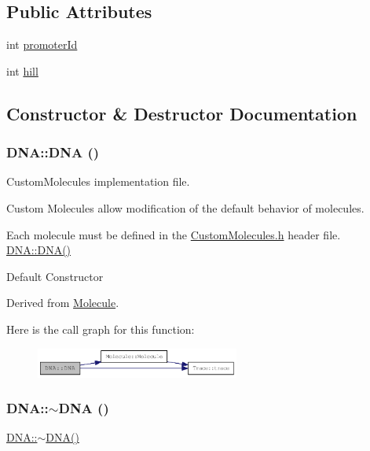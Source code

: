 \subsection*{Public Attributes}
\begin{DoxyCompactItemize}
\item 
int \hyperlink{classDNA_a29696d77ea7eaabd48ee1d7eb9705b8e}{promoterId}
\item 
int \hyperlink{classDNA_a1c70e6e5beaf9ac5bfb9ab0d2cbf7f75}{hill}
\end{DoxyCompactItemize}


\subsection{Constructor \& Destructor Documentation}
\hypertarget{classDNA_a3bad49a2b4f2afcc3a55f1d663e2d14e}{
\subsubsection[{DNA}]{\setlength{\rightskip}{0pt plus 5cm}DNA::DNA ()}}
\label{classDNA_a3bad49a2b4f2afcc3a55f1d663e2d14e}
CustomMolecules implementation file.

Custom Molecules allow modification of the default behavior of molecules.

Each molecule must be defined in the \hyperlink{CustomMolecules_8h}{CustomMolecules.h} header file. \hyperlink{classDNA_a3bad49a2b4f2afcc3a55f1d663e2d14e}{DNA::DNA()}

Default Constructor

Derived from \hyperlink{classMolecule}{Molecule}. 

Here is the call graph for this function:\nopagebreak
\begin{figure}[H]
\begin{center}
\leavevmode
\includegraphics[width=190pt]{classDNA_a3bad49a2b4f2afcc3a55f1d663e2d14e_cgraph}
\end{center}
\end{figure}
\hypertarget{classDNA_ae839223a414026e083f5ba7491979e78}{
\subsubsection[{$\sim$DNA}]{\setlength{\rightskip}{0pt plus 5cm}DNA::$\sim$DNA ()}}
\label{classDNA_ae839223a414026e083f5ba7491979e78}
\hyperlink{classDNA_ae839223a414026e083f5ba7491979e78}{DNA::$\sim$DNA()}

